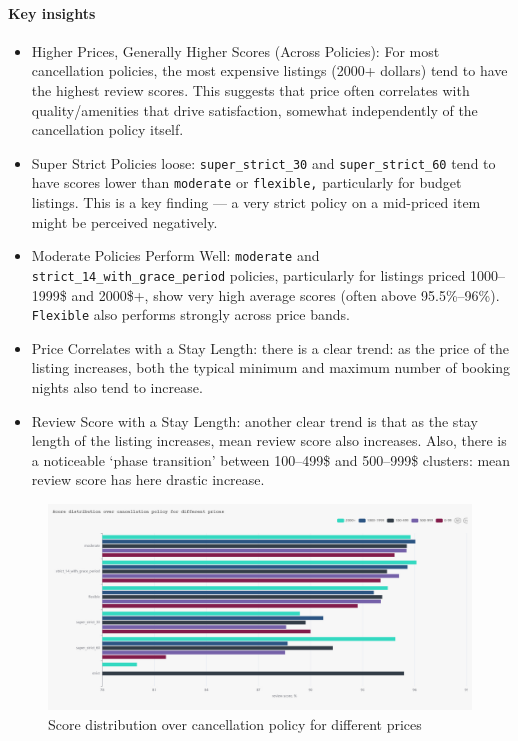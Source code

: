 \paragraph{Key insights}
\begin{itemize}
    \item Higher Prices, Generally Higher Scores (Across Policies): For most cancellation policies, the most expensive listings (2000+ dollars) tend to have the highest review scores. This suggests that price often correlates with quality/amenities that drive satisfaction, somewhat independently of the cancellation policy itself.
    \item Super Strict Policies loose: \texttt{super\_strict\_30} and \texttt{super\_strict\_60} tend to have scores lower than \texttt{moderate} or \texttt{flexible,} particularly for budget listings. This is a key finding --- a very strict policy on a mid-priced item might be perceived negatively.
    \item Moderate Policies Perform Well: \texttt{moderate} and \texttt{strict\_14\_with\_grace\_period} policies, particularly for listings priced 1000--1999\$ and 2000\$+, show very high average scores (often above 95.5\%--96\%). \texttt{Flexible} also performs strongly across price bands.
    \item Price Correlates with a Stay Length: there is a clear trend: as the price of the listing increases, both the typical minimum and maximum number of booking nights also tend to increase.
    \item Review Score with a Stay Length: another clear trend is that as the stay length of the listing increases, mean review score also increases. Also, there is a noticeable `phase transition' between 100--499\$ and 500--999\$ clusters: mean review score has here drastic increase.
\end{itemize}

\vspace{1em}
\begin{figure}[H]
    \centering
    \includegraphics[width=1\textwidth]{images/q2_1.jpg}
    \caption{Score distribution over cancellation policy for different prices}\label{fig:figureq3}
\end{figure}

